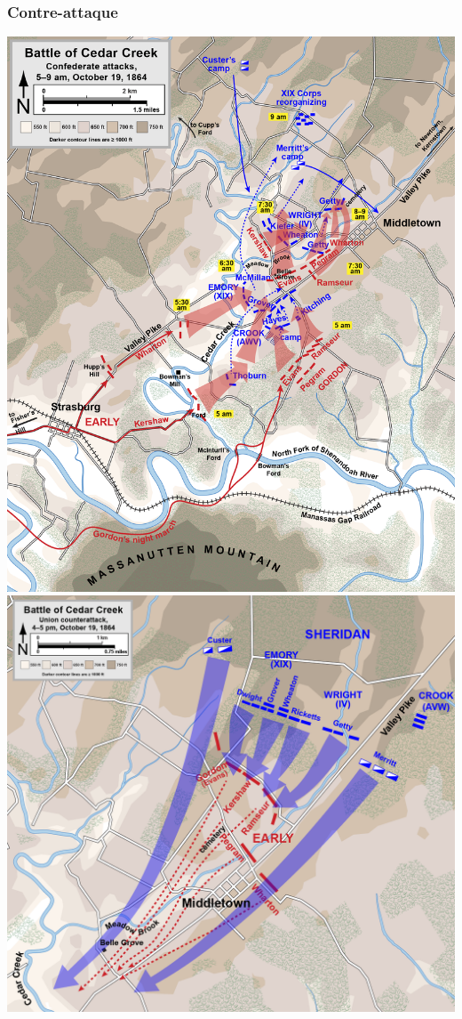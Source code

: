 \documentclass{article}
\begin{document}
\subsubsection{Contre-attaque}
\includegraphics[width=\linewidth]{../ressources/Cedar_Creek_Confederate_attacks}
\includegraphics[width=\linewidth]{../ressources/Cedar_Creek_Union_counterattack}
\cite{counterattack_wiki, couterattack_cedar_creek}
\end{document}
